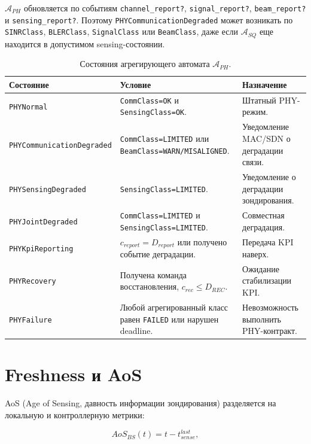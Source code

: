 \documentclass[12pt,a4paper]{article}
\begin{document}
\(\mathcal{A}_{PH}\) обновляется по событиям \texttt{channel\_report?}, \texttt{signal\_report?}, \texttt{beam\_report?} и \texttt{sensing\_report?}. Поэтому \texttt{PHYCommunicationDegraded} может возникать по \texttt{SINRClass}, \texttt{BLERClass}, \texttt{SignalClass} или \texttt{BeamClass}, даже если \(\mathcal{A}_{SQ}\) еще находится в допустимом sensing-состоянии.

\begin{table}[htbp]
\centering
\small
\setlength{\tabcolsep}{4pt}
\begin{tabularx}{\textwidth}{p{}YY}
\toprule
Состояние & Условие & Назначение \\
\midrule
\texttt{PHYNormal} & \texttt{CommClass=OK} и \texttt{SensingClass=OK}. & Штатный PHY-режим. \\
\texttt{PHYCommunicationDegraded} & \texttt{CommClass=LIMITED} или \texttt{BeamClass=WARN/MISALIGNED}. & Уведомление MAC/SDN о деградации связи. \\
\texttt{PHYSensingDegraded} & \texttt{SensingClass=LIMITED}. & Уведомление о деградации зондирования. \\
\texttt{PHYJointDegraded} & \texttt{CommClass=LIMITED} и \texttt{SensingClass=LIMITED}. & Совместная деградация. \\
\texttt{PHYKpiReporting} & $c_{report}=D_{report}$ или получено событие деградации. & Передача KPI наверх. \\
\texttt{PHYRecovery} & Получена команда восстановления, $c_{rec}\le D_{REC}$. & Ожидание стабилизации KPI. \\
\texttt{PHYFailure} & Любой агрегированный класс равен \texttt{FAILED} или нарушен deadline. & Невозможность выполнить PHY-контракт. \\
\bottomrule
\end{tabularx}
\caption{Состояния агрегирующего автомата $\mathcal{A}_{PH}$.}
\label{tab:phy_states}
\end{table}

\section{Freshness и AoS}

AoS (Age of Sensing, давность информации зондирования) разделяется на локальную и контроллерную метрики:

\begin{equation}
AoS_{BS}(t)=t-t_{sense}^{last},
\end{equation}
\end{document}
